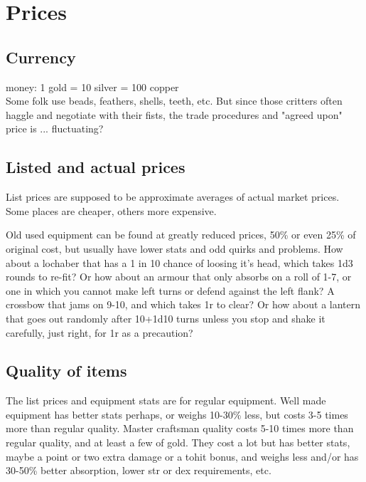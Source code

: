 



\cleardoublepage

\chapter*{Prices}





\section*{Currency}
money: 1 gold = 10 silver = 100 copper\\
Some folk use beads, feathers, shells, teeth, etc. But since those critters often haggle and negotiate with their fists, the trade procedures and "agreed upon" price is ... fluctuating?




\section*{Listed and actual prices}
List prices are supposed to be approximate averages of actual market prices. Some places are cheaper, others more expensive.

Old used equipment can be found at greatly reduced prices, 50\% or even 25\% of original cost, but usually have lower stats and odd quirks and problems. How about a lochaber that has a 1 in 10 chance of loosing it's head, which takes 1d3 rounds to re-fit? Or how about an armour that only absorbs on a roll of 1-7, or one in which you cannot make left turns or defend against the left flank? A crossbow that jams on 9-10, and which takes 1r to clear? Or how about a lantern that goes out randomly after 10+1d10 turns unless you stop and shake it carefully, just right, for 1r as a precaution?


\section*{Quality of items}
The list prices and equipment stats are for regular equipment. Well made equipment has better stats perhaps, or weighs 10-30\% less, but costs 3-5 times more than regular quality. Master craftsman quality costs 5-10 times more than regular quality, and at least a few of gold. They cost a lot but has better stats, maybe a point or two extra damage or a tohit bonus, and weighs less and/or has 30-50\% better absorption, lower str or dex requirements, etc.

